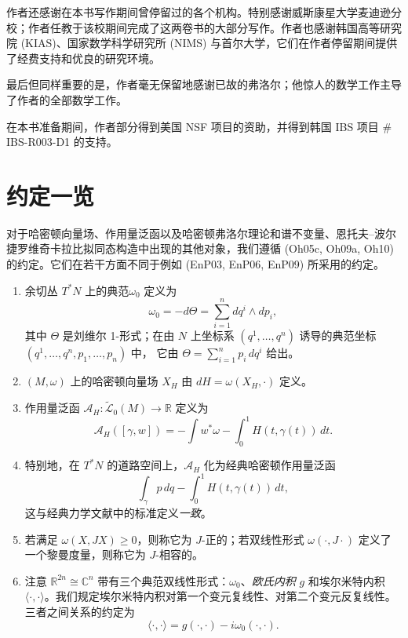 作者还感谢在本书写作期间曾停留过的各个机构。特别感谢威斯康星大学麦迪逊分校；作者任教于该校期间完成了这两卷书的大部分写作。作者也感谢韩国高等研究院 (KIAS)、国家数学科学研究所 (NIMS) 与首尔大学，它们在作者停留期间提供了经费支持和优良的研究环境。

最后但同样重要的是，作者毫无保留地感谢已故的弗洛尔；他惊人的数学工作主导了作者的全部数学工作。

在本书准备期间，作者部分得到美国 NSF 项目的资助，并得到韩国 IBS 项目 \# IBS-R003-D1 的支持。

\section*{约定一览}

对于哈密顿向量场、作用量泛函以及哈密顿弗洛尔理论和谱不变量、恩托夫--波尔捷罗维奇卡拉比拟同态构造中出现的其他对象，我们遵循 (Oh05c, Oh09a, Oh10) 的约定。它们在若干方面不同于例如 (EnP03, EnP06, EnP09) 所采用的约定。

\begin{enumerate}[label=(\arabic*)]
  \item 余切丛 $T^*N$ 上的典范\termSymplecticForm $\omega_0$ 定义为
  \[
    \omega_0=-d\Theta=\sum_{i=1}^n dq^i\wedge dp_i,
  \]
  其中 $\Theta$ 是刘维尔 1-形式；在由 $N$ 上坐标系
  $(q^1,\ldots,q^n)$ 诱导的典范坐标
  $(q^1,\ldots,q^n,\allowbreak p_1,\ldots,p_n)$ 中，
  它由 $\Theta=\sum_{i=1}^n p_i\,dq^i$ 给出。

  \item \termSymplecticManifold $(M,\omega)$ 上的哈密顿向量场 $X_H$ 由 $dH=\omega(X_H,\cdot)$ 定义。

  \item 作用量泛函 $\mathcal A_H:\widetilde{\mathcal L}_0(M)\to\mathbb R$ 定义为
  \[
    \mathcal A_H([\gamma,w])=-\int w^*\omega-\int_0^1 H(t,\gamma(t))\,dt.
  \]

  \item 特别地，在 $T^*N$ 的道路空间上，$\mathcal A_H$ 化为经典哈密顿作用量泛函
  \[
    \int_\gamma p\,dq-\int_0^1 H(t,\gamma(t))\,dt,
  \]
  这与经典力学文献中的标准定义\emph{一致}。

  \item 若\termAlmostComplexStructure{}满足 $\omega(X,JX)\geq 0$，则称它为 $J$-正的；若双线性形式 $\omega(\cdot,J\cdot)$ 定义了一个黎曼度量，则称它为 $J$-相容的。

  \item 注意 $\mathbb R^{2n}\cong\mathbb C^n$ 带有三个典范双线性形式：\termSymplecticForm $\omega_0$、\emph{欧氏内积} $g$ 和埃尔米特内积 $\langle\cdot,\cdot\rangle$。我们规定埃尔米特内积对第一个变元复线性、对第二个变元反复线性。三者之间关系的约定为
  \[
    \langle\cdot,\cdot\rangle=g(\cdot,\cdot)-i\omega_0(\cdot,\cdot).
  \]
\end{enumerate}

